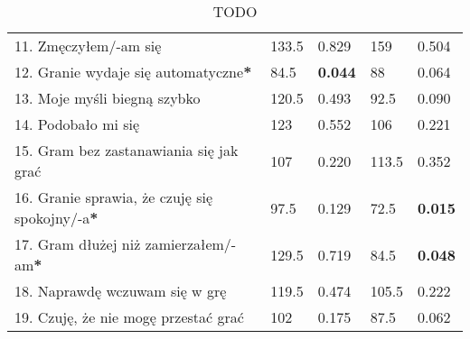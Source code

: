 \begin{table}[h!]
\begin{center}
\begin{tabular}{|m{10em}|m{5em}|m{5em}|m{5em}|m{5em}|}
            11. Zmęczyłem/-am się                                             & 133.5                       & 0.829            & 159                     & 0.504          \\
            12. Granie wydaje się automatyczne\textbf{*}                      & 84.5                        & \textbf{0.044}   & 88                      & 0.064          \\
            13. Moje myśli \newline biegną szybko                             & 120.5                       & 0.493            & 92.5                    & 0.090          \\
            14. Podobało mi się                                               & 123                         & 0.552            & 106                     & 0.221          \\
            15. Gram bez zastanawiania się jak grać                           & 107                         & 0.220            & 113.5                   & 0.352          \\
            16. Granie sprawia, \newline że czuję się spokojny/-a\textbf{*}   & 97.5                        & 0.129            & 72.5                    & \textbf{0.015} \\
            17. Gram dłużej \newline niż zamierzałem/-am\textbf{*}            & 129.5                       & 0.719            & 84.5                    & \textbf{0.048} \\
            18. Naprawdę wczuwam się w grę                                    & 119.5                       & 0.474            & 105.5                   & 0.222          \\
            19. Czuję, że nie mogę przestać grać                              & 102                         & 0.175            & 87.5                    & 0.062          \\
            \hline
        \end{tabular}
    \end{center}
    \caption{TODO}\label{tab1:ch7_14}
\end{table}

